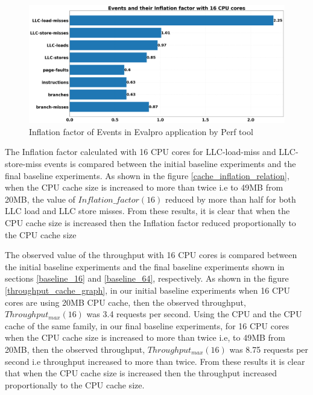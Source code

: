 \documentclass{iitbreport}
\begin{document}
\begin{figure}[!htb]
  \centering
  \includegraphics[width=\linewidth]{Images/perf_evalpro_application.png}
  \caption{Inflation factor of Events in Evalpro application by Perf tool}
  \label{perf_results_application}
\end{figure}





The Inflation factor calculated with 16 CPU cores for LLC-load-miss and LLC-store-miss events is compared between  the initial baseline experiments and the final baseline experiments. As shown in the figure \ref{cache_inflation_relation}, when the CPU cache size is increased to more than twice i.e to 49MB from 20MB, the value of $Inflation\_factor(16)$ reduced by more than half for both LLC load and LLC store misses. From these results, it is clear that when the CPU cache size is increased then the Inflation factor reduced proportionally to the CPU cache size

The observed value of the throughput with 16 CPU cores is compared between  the initial baseline experiments and the final baseline experiments shown in sections \ref{baseline_16} and \ref{baseline_64}, respectively. As shown in the figure \ref{throughput_cache_graph}, in our initial baseline experiments  when 16 CPU cores are using 20MB CPU cache, then the observed  throughput, $Throughput_{max}(16)$ was 3.4 requests per second. Using the CPU  and the CPU cache of the same family, in our final  baseline experiments, for 16 CPU cores when the CPU cache size is increased to more than twice i.e, to 49MB from 20MB, then the observed  throughput, $Throughput_{max}(16)$ was 8.75 requests per second i.e throughput increased to more than twice. From these results it is clear that when the CPU cache size is increased then the throughput increased proportionally to the CPU cache size.
\end{document}
